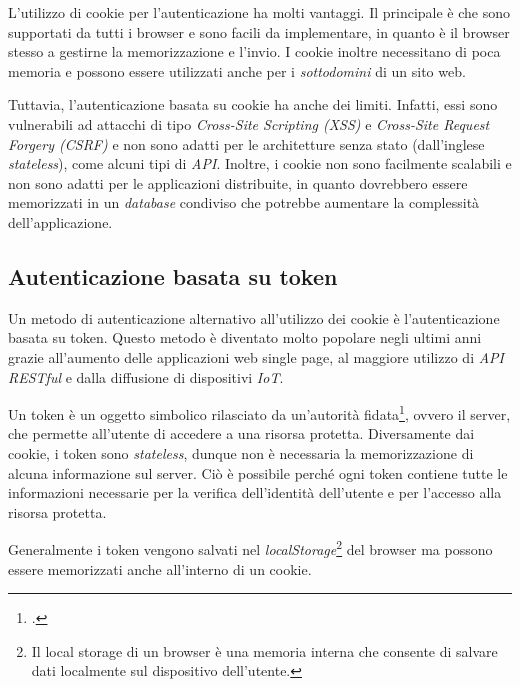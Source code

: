 \noindent L'utilizzo di cookie per l'autenticazione ha molti vantaggi.
Il principale è che sono supportati da tutti i browser e sono facili da implementare, in quanto è il browser stesso a gestirne la memorizzazione e l'invio.
I cookie inoltre necessitano di poca memoria e possono essere utilizzati anche per i \emph{sottodomini} di un sito web.

Tuttavia, l'autenticazione basata su cookie ha anche dei limiti.
Infatti, essi sono vulnerabili ad attacchi di tipo \emph{Cross-Site Scripting (XSS)} e \emph{Cross-Site Request Forgery (CSRF)} e non sono adatti per le architetture senza stato (dall'inglese \emph{stateless}), come alcuni tipi di \emph{\gls{API}}.
Inoltre, i cookie non sono facilmente scalabili e non sono adatti per le applicazioni distribuite, in quanto dovrebbero essere memorizzati in un \emph{database} condiviso che potrebbe aumentare la complessità dell'applicazione.

\subsection{Autenticazione basata su token}
Un metodo di autenticazione alternativo all'utilizzo dei cookie è l'autenticazione basata su token.
Questo metodo è diventato molto popolare negli ultimi anni grazie all'aumento delle applicazioni web single page, al maggiore utilizzo di \emph{\gls{API RESTful}} e dalla diffusione di dispositivi \emph{\gls{IoT}}.

Un token è un oggetto simbolico rilasciato da un'autorità fidata\footcite{site:token-based-authentication-cloudflare}, ovvero il server, che permette all'utente di accedere a una risorsa protetta.
Diversamente dai cookie, i token sono \emph{stateless}, dunque non è necessaria la memorizzazione di alcuna informazione sul server.
Ciò è possibile perché ogni token contiene tutte le informazioni necessarie per la verifica dell'identità dell'utente e per l'accesso alla risorsa protetta.

Generalmente i token vengono salvati nel \emph{localStorage}\footnote{Il local storage di un browser è una memoria interna che consente di salvare dati localmente sul dispositivo dell'utente.} del browser ma possono essere memorizzati anche all'interno di un cookie.\\

